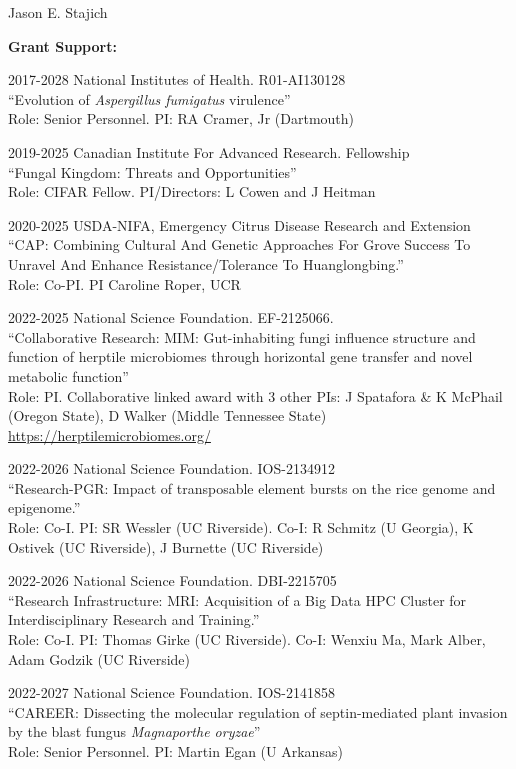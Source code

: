 \documentclass[10pt]{article}
\begin{document}
\begin{cv}{\centerline{Jason E. Stajich}}
\begin{cvlistcompact}{\bf Grant Support:}
\item [2017-2028] National Institutes of Health. R01-AI130128 \\
  ``Evolution of \textit{Aspergillus fumigatus} virulence'' \\
Role: Senior Personnel. PI: RA Cramer, Jr (Dartmouth)

\item [2019-2025] Canadian Institute For Advanced Research. Fellowship \\
  ``Fungal Kingdom: Threats and Opportunities'' \\
Role: CIFAR Fellow. PI/Directors: L Cowen and J Heitman

\item [2020-2025] USDA-NIFA, Emergency Citrus Disease Research and Extension \\
``CAP: Combining Cultural And Genetic Approaches For Grove Success To Unravel And Enhance Resistance/Tolerance To Huanglongbing.'' \\
Role: Co-PI. PI Caroline Roper, UCR

\item [2022-2025] National Science Foundation. EF-2125066. \\
``Collaborative Research: MIM: Gut-inhabiting fungi influence structure and function of herptile microbiomes through horizontal gene transfer and novel metabolic function'' \\
  Role: PI. Collaborative linked award with 3 other PIs: J Spatafora \& K McPhail (Oregon State), D Walker (Middle Tennessee State)
\url{https://herptilemicrobiomes.org/}

\item [2022-2026] National Science Foundation. IOS-2134912 \\
  ``Research-PGR: Impact of transposable element bursts on the rice genome and epigenome.'' \\
Role: Co-I. PI: SR Wessler (UC Riverside). Co-I: R Schmitz (U Georgia), K Ostivek (UC Riverside), J Burnette (UC Riverside)

\item [2022-2026] National Science Foundation. DBI-2215705 \\
``Research Infrastructure: MRI: Acquisition of a Big Data HPC Cluster for Interdisciplinary Research and Training.'' \\
Role: Co-I. PI: Thomas Girke (UC Riverside). Co-I: Wenxiu Ma, Mark Alber, Adam Godzik (UC Riverside)

\item [2022-2027] National Science Foundation. IOS-2141858 \\
``CAREER: Dissecting the molecular regulation of septin-mediated plant invasion by the blast fungus \textit{Magnaporthe oryzae}'' \\
Role: Senior Personnel. PI: Martin Egan (U Arkansas)


\end{cvlistcompact}
\end{cv}
\end{document}
